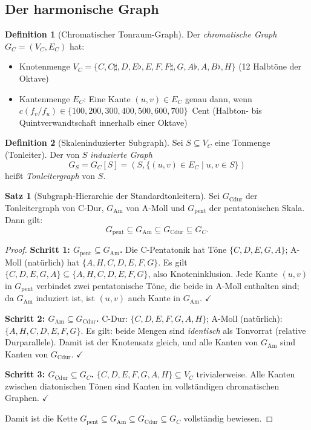 ﻿\documentclass[a4paper,12pt]{article}
\theoremstyle{definition}
\newtheorem{definition}{Definition}
\newtheorem{satz}{Satz}
\begin{document}
\subsection{Der harmonische Graph}

\begin{definition}[Chromatischer Tonraum-Graph]
Der \emph{chromatische Graph} $G_C = (V_C, E_C)$ hat:
\begin{itemize}
    \item Knotenmenge $V_C = \{C, C\sharp, D, E\flat, E, F, F\sharp, G,
          A\flat, A, B\flat, H\}$ (12 Halbtöne der Oktave)
    \item Kantenmenge $E_C$: Eine Kante $(u,v) \in E_C$ genau dann, wenn
          $c(f_v/f_u) \in \{100, 200, 300, 400, 500, 600, 700\}$~Cent
          (Halbton- bis Quintverwandtschaft innerhalb einer Oktave)
\end{itemize}
\end{definition}

\begin{definition}[Skaleninduzierter Subgraph]
Sei $S \subseteq V_C$ eine Tonmenge (Tonleiter). Der von $S$ \emph{induzierte Graph}
\[
G_S = G_C[S] = (S, \{(u,v) \in E_C \mid u,v \in S\})
\]
heißt \emph{Tonleitergraph} von $S$.
\end{definition}

\begin{satz}[Subgraph-Hierarchie der Standardtonleitern]
\label{satz:subgraph}
Sei $G_{\mathrm{Cdur}}$ der Tonleitergraph von C-Dur, $G_{\mathrm{Am}}$ von
A-Moll und $G_{\mathrm{pent}}$ der pentatonischen Skala. Dann gilt:
\[
G_{\mathrm{pent}} \subseteq G_{\mathrm{Am}} \subseteq G_{\mathrm{Cdur}} \subseteq G_C.
\]
\end{satz}

\begin{proof}
\textbf{Schritt 1: $G_{\mathrm{pent}} \subseteq G_{\mathrm{Am}}$.}
Die C-Pentatonik hat Töne $\{C, D, E, G, A\}$; A-Moll (natürlich) hat $\{A, H, C, D, E, F, G\}$.
Es gilt $\{C,D,E,G,A\} \subseteq \{A,H,C,D,E,F,G\}$, also Knoteninklusion.
Jede Kante $(u,v)$ in $G_{\mathrm{pent}}$ verbindet zwei pentatonische Töne,
die beide in A-Moll enthalten sind; da $G_{\mathrm{Am}}$ induziert ist,
ist $(u,v)$ auch Kante in $G_{\mathrm{Am}}$. $\checkmark$

\textbf{Schritt 2: $G_{\mathrm{Am}} \subseteq G_{\mathrm{Cdur}}$.}
C-Dur: $\{C,D,E,F,G,A,H\}$; A-Moll (natürlich): $\{A,H,C,D,E,F,G\}$.
Es gilt: beide Mengen sind \emph{identisch} als Tonvorrat (relative Durparallele).
Damit ist der Knotensatz gleich, und alle Kanten von $G_{\mathrm{Am}}$ sind
Kanten von $G_{\mathrm{Cdur}}$. $\checkmark$

\textbf{Schritt 3: $G_{\mathrm{Cdur}} \subseteq G_C$.}
$\{C,D,E,F,G,A,H\} \subseteq V_C$ trivialerweise. Alle Kanten zwischen diatonischen
Tönen sind Kanten im vollständigen chromatischen Graphen. $\checkmark$

Damit ist die Kette $G_{\mathrm{pent}} \subseteq G_{\mathrm{Am}} \subseteq
G_{\mathrm{Cdur}} \subseteq G_C$ vollständig bewiesen.
\end{proof}
\end{document}
